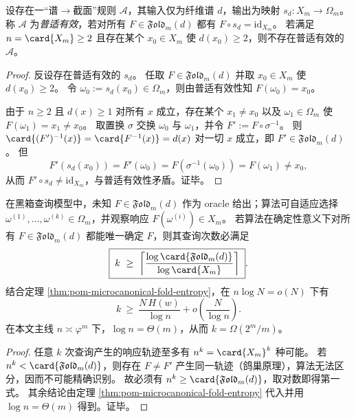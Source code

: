 \begin{theorem}\label{thm:pom-spectrum-cannot-induce-universal-section}
设存在一“谱\(\to\)截面”规则 \(\mathcal{A}\)，其输入仅为纤维谱 \(d\)，输出为映射 \(s_d:X_m\to\Omega_m\)。
称 \(\mathcal{A}\) 为\emph{普适有效}，若对所有 \(F\in\mathfrak{Fold}_m(d)\) 都有 \(F\circ s_d=\mathrm{id}_{X_m}\)。
若满足 \(n=\card{X_m}\ge 2\) 且存在某个 \(x_0\in X_m\) 使 \(d(x_0)\ge 2\)，则不存在普适有效的 \(\mathcal{A}\)。
\end{theorem}
\begin{proof}
反设存在普适有效的 \(s_d\)。
任取 \(F\in\mathfrak{Fold}_m(d)\) 并取 \(x_0\in X_m\) 使 \(d(x_0)\ge 2\)。
令 \(\omega_0:=s_d(x_0)\in\Omega_m\)，则由普适有效性知 \(F(\omega_0)=x_0\)。
\par
由于 \(n\ge 2\) 且 \(d(x)\ge 1\) 对所有 \(x\) 成立，存在某个 \(x_1\neq x_0\) 以及 \(\omega_1\in\Omega_m\) 使 \(F(\omega_1)=x_1\neq x_0\)。
取置换 \(\sigma\) 交换 \(\omega_0\) 与 \(\omega_1\)，并令 \(F':=F\circ\sigma^{-1}\)。
则 \(\card{(F')^{-1}(x)}=\card{F^{-1}(x)}=d(x)\) 对一切 \(x\) 成立，即 \(F'\in\mathfrak{Fold}_m(d)\)。
但
\[
F'(s_d(x_0))=F'(\omega_0)=F(\sigma^{-1}(\omega_0))=F(\omega_1)\neq x_0,
\]
从而 \(F'\circ s_d\neq \mathrm{id}_{X_m}\)，与普适有效性矛盾。证毕。
\end{proof}

\begin{theorem}\label{thm:pom-microcanonical-fold-query-lower-bound}
在黑箱查询模型中，未知 \(F\in\mathfrak{Fold}_m(d)\) 作为 oracle 给出；算法可自适应选择
\(\omega^{(1)},\dots,\omega^{(k)}\in\Omega_m\)，并观察响应 \(F(\omega^{(i)})\in X_m\)。
若算法在确定性意义下对所有 \(F\in\mathfrak{Fold}_m(d)\) 都能唯一确定 \(F\)，则其查询次数必满足
\[
\boxed{\;
k\ \ge\ \left\lceil \frac{\log\card{\mathfrak{Fold}_m(d)}}{\log\card{X_m}}\right\rceil\; } .
\]
结合定理 \ref{thm:pom-microcanonical-fold-entropy}，在 \(n\log N=o(N)\) 下有
\[
k\ \ge\ \frac{N\,H(w)}{\log n}+o\!\left(\frac{N}{\log n}\right).
\]
在本文主线 \(n\asymp\varphi^m\) 下，\(\log n=\Theta(m)\)，从而 \(k=\Omega(2^m/m)\)。
\end{theorem}
\begin{proof}
任意 \(k\) 次查询产生的响应轨迹至多有 \(n^k=\card{X_m}^k\) 种可能。
若 \(n^k<\card{\mathfrak{Fold}_m(d)}\)，则存在 \(F\neq F'\) 产生同一轨迹（鸽巢原理），算法无法区分，因而不可能精确识别。
故必须有 \(n^k\ge \card{\mathfrak{Fold}_m(d)}\)，取对数即得第一式。
其余结论由定理 \ref{thm:pom-microcanonical-fold-entropy} 代入并用 \(\log n=\Theta(m)\) 得到。证毕。
\end{proof}

